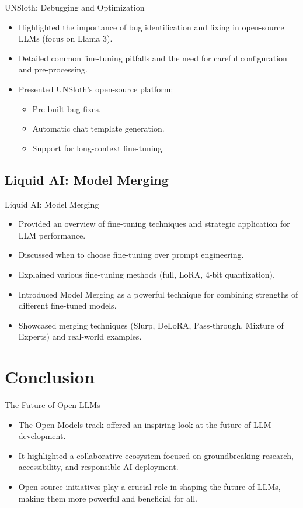 \documentclass{beamer}
\begin{document}
\begin{frame}{UNSloth: Debugging and Optimization}
  \begin{itemize}
    \item Highlighted the importance of bug identification and fixing in open-source LLMs (focus on Llama 3).
    \item Detailed common fine-tuning pitfalls and the need for careful configuration and pre-processing.
    \item Presented UNSloth's open-source platform:
      \begin{itemize}
        \item Pre-built bug fixes.
        \item Automatic chat template generation.
        \item Support for long-context fine-tuning. 
      \end{itemize}
  \end{itemize}
\end{frame}

\subsection{Liquid AI: Model Merging}

\begin{frame}{Liquid AI: Model Merging}
  \begin{itemize}
    \item Provided an overview of fine-tuning techniques and strategic application for LLM performance. 
    \item Discussed when to choose fine-tuning over prompt engineering.
    \item Explained various fine-tuning methods (full, LoRA, 4-bit quantization).
    \item Introduced Model Merging as a powerful technique for combining strengths of different fine-tuned models.
    \item Showcased merging techniques (Slurp, DeLoRA, Pass-through, Mixture of Experts) and real-world examples.
  \end{itemize}
\end{frame}

\section{Conclusion}

\begin{frame}{The Future of Open LLMs} 
  \begin{itemize}
    \item The Open Models track offered an inspiring look at the future of LLM development.
    \item It highlighted a collaborative ecosystem focused on groundbreaking research, accessibility, and responsible AI deployment.
    \item Open-source initiatives play a crucial role in shaping the future of LLMs, making them more powerful and beneficial for all. 
  \end{itemize}
\end{frame}
\end{document}
